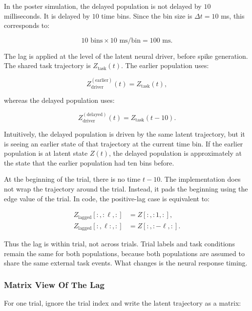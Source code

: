\documentclass[11pt]{article}
\begin{document}
In the poster simulation, the delayed population is not delayed by
$10$ milliseconds. It is delayed by $10$ time bins. Since the bin size is
$\Delta t = 10$ ms, this corresponds to:

\begin{equation}
10 \text{ bins} \times 10 \text{ ms/bin} = 100 \text{ ms}.
\end{equation}

The lag is applied at the level of the latent neural driver, before spike
generation. The shared task trajectory is $Z_{\text{task}}(t)$. The earlier
population uses:

\begin{equation}
Z_{\text{driver}}^{(\text{earlier})}(t)
=
Z_{\text{task}}(t),
\end{equation}

whereas the delayed population uses:

\begin{equation}
Z_{\text{driver}}^{(\text{delayed})}(t)
=
Z_{\text{task}}(t-10).
\end{equation}

Intuitively, the delayed population is driven by the same latent trajectory,
but it is seeing an earlier state of that trajectory at the current time bin.
If the earlier population is at latent state $Z(t)$, the delayed population is
approximately at the state that the earlier population had ten bins before.

At the beginning of the trial, there is no time $t-10$. The implementation does
not wrap the trajectory around the trial. Instead, it pads the beginning using
the edge value of the trial. In code, the positive-lag case is equivalent to:

\begin{align}
Z_{\text{lagged}}[:, :\ell, :]
&=
Z[:, :1, :],
\\
Z_{\text{lagged}}[:, \ell:, :]
&=
Z[:, :-\ell, :].
\end{align}

Thus the lag is within trial, not across trials. Trial labels and task
conditions remain the same for both populations, because both populations are
assumed to share the same external task events. What changes is the neural
response timing.

\subsubsection{Matrix View Of The Lag}

For one trial, ignore the trial index and write the latent trajectory as a
matrix:
\end{document}
